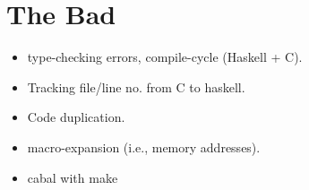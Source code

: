 \section{The Bad}


\begin{itemize}
\item type-checking errors, compile-cycle (Haskell + C). 
\item Tracking file/line no. from C to haskell.
\item Code duplication.
\item macro-expansion (i.e., memory addresses).
\item cabal with make
\end{itemize}


